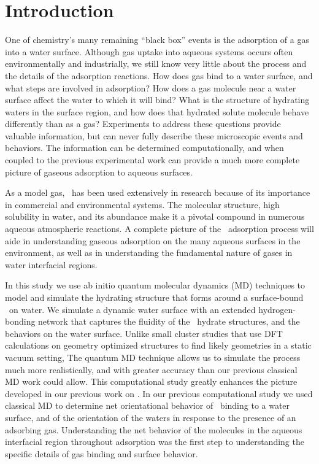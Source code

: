 \section {Introduction}

One of chemistry's many remaining ``black box'' events is the adsorption of a gas into a water surface. Although gas uptake into aqueous systems occurs often environmentally and industrially, we still know very little about the process and the details of the adsorption reactions. How does gas bind to a water surface, and what steps are involved in adsorption? How does a gas molecule near a water surface affect the water to which it will bind? What is the structure of hydrating waters in the surface region, and how does that hydrated solute molecule behave differently than as a gas? Experiments to address these questions provide valuable information, but can never fully describe these microscopic events and behaviors. The information can be determined computationally, and when coupled to the previous experimental work can provide a much more complete picture of gaseous adsorption to aqueous surfaces.

As a model gas, \suldiox~has been used extensively in research because of its importance in commercial and environmental systems. The molecular structure, high solubility in water, and its abundance make it a pivotal compound in numerous aqueous atmospheric reactions. A complete picture of the \suldiox~adsorption process will aide in understanding gaseous adsorption on the many aqueous surfaces in the environment, as well as in understanding the fundamental nature of gases in water interfacial regions. 

In this study we use ab initio quantum molecular dynamics (MD) techniques to model and simulate the hydrating structure that forms around a surface-bound \suldiox~on water. We simulate a dynamic water surface with an extended hydrogen-bonding network that captures the fluidity of the \suldiox~hydrate structures, and the behaviors on the water surface. Unlike small cluster studies that use DFT calculations on geometry optimized structures to find likely geometries in a static vacuum setting, The quantum MD technique allows us to simulate the process much more realistically, and with greater accuracy than our previous classical MD work could allow.\cite{Shamay2011} This computational study greatly enhances the picture developed in our previous work on \suldiox. In our previous computational study we used classical MD to determine net orientational behavior of \suldiox~binding to a water surface, and of the orientation of the waters in response to the presence of an adsorbing gas. Understanding the net behavior of the molecules in the aqueous interfacial region throughout adsorption was the first step to understanding the specific details of gas binding and surface behavior. 

